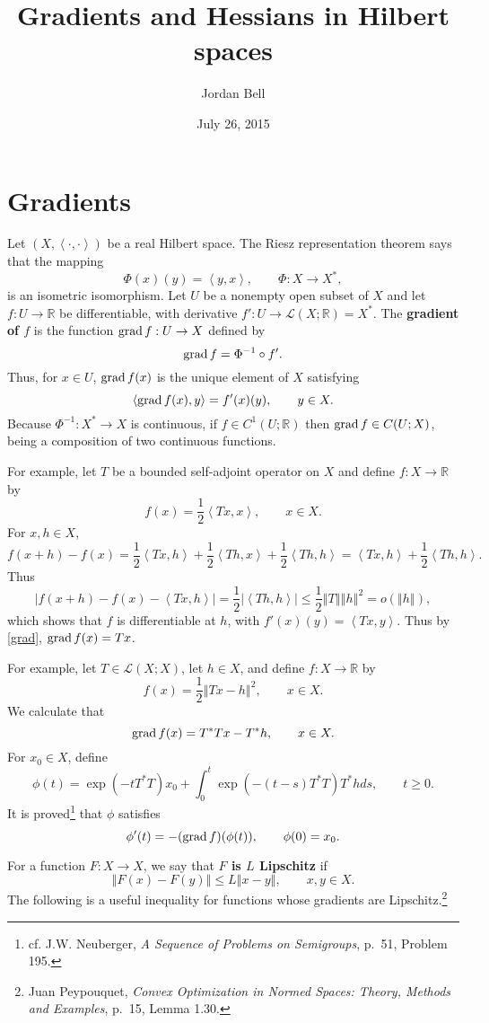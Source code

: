\documentclass{article}
\newcommand{\inner}[2]{\left\langle #1, #2 \right\rangle}
\newcommand{\grad}{\ensuremath\mathrm{grad}\,}
\newcommand{\norm}[1]{\left\Vert #1 \right\Vert}
\theoremstyle{definition}
\begin{document}
\title{Gradients and Hessians in Hilbert spaces}
\author{Jordan Bell}
\date{July 26, 2015}

\maketitle

\section{Gradients}
Let $(X,\inner{\cdot}{\cdot})$ be a real Hilbert space. The Riesz representation theorem says that
the mapping
\[
\Phi(x)(y)=\inner{y}{x}, \qquad \Phi:X \to X^*,
\]
 is an isometric isomorphism. 
Let $U$ be a nonempty open subset of $X$ and 
let $f:U \to \mathbb{R}$ be differentiable, with derivative
$f':U \to \mathscr{L}(X;\mathbb{R})=X^*$.
The \textbf{gradient of $f$} is the function $\grad f:U \to X$ defined by
\[
\grad f = \Phi^{-1} \circ f'.
\]  
Thus, for $x \in U$, $\grad f(x)$ is the unique element of $X$ satisfying
\begin{equation}
\inner{\grad f(x)}{y}=f'(x)(y), \qquad y \in X.
\label{grad}
\end{equation}
Because $\Phi^{-1}:X^* \to X$ is continuous,
if $f \in C^1(U;\mathbb{R})$ then $\grad f \in C(U;X)$, being a composition of two continuous functions.

For example, let $T$ be a bounded self-adjoint operator on $X$ and define $f:X \to \mathbb{R}$ by
\[
f(x) = \frac{1}{2}\inner{Tx}{x}, \qquad x \in X.
\]
For $x,h \in X$,
\[
f(x+h)-f(x) = \frac{1}{2}\inner{Tx}{h}+\frac{1}{2}\inner{Th}{x}+\frac{1}{2}\inner{Th}{h}
=\inner{Tx}{h}+\frac{1}{2}\inner{Th}{h}.
\]
Thus
\[
|f(x+h)-f(x)-\inner{Tx}{h}| = \frac{1}{2}|\inner{Th}{h}| \leq \frac{1}{2} \norm{T} \norm{h}^2 = o(\norm{h}),
\]
which shows that $f$ is differentiable at $h$, with $f'(x)(y) = \inner{Tx}{y}$. 
Thus by \eqref{grad}, $\grad f(x) = Tx$. 

For example, let $T \in \mathscr{L}(X;X)$, let $h \in X$, and define $f:X \to \mathbb{R}$ by
\[
f(x) = \frac{1}{2} \norm{Tx-h}^2, \qquad  x \in X.
\]
We calculate that
\[
\grad f(x) = T^*Tx-T^*h, \qquad x \in X.
\]
For $x_0 \in X$, define
\[
\phi(t) = \exp(-tT^*T)x_0 + \int_0^t \exp(-(t-s)T^*T)T^*h ds, \qquad t \geq 0.
\]
It is proved\footnote{cf. J.W. Neuberger, {\em A Sequence of Problems on Semigroups}, p.~51, Problem 195.}
that $\phi$ satisfies
\[
\phi'(t) = -(\grad f)(\phi(t)), \qquad \phi(0)=x_0.
\]


For a function $F:X \to X$, we say that \textbf{$F$ is $L$ Lipschitz} if
\[
\norm{F(x)-F(y)} \leq L \norm{x-y}, \qquad x,y \in X.
\] 
The following is a useful inequality for functions whose gradients are Lipschitz.\footnote{Juan Peypouquet,
{\em Convex Optimization in Normed Spaces: Theory, Methods and Examples}, p.~15, Lemma 1.30.}
\end{document}

